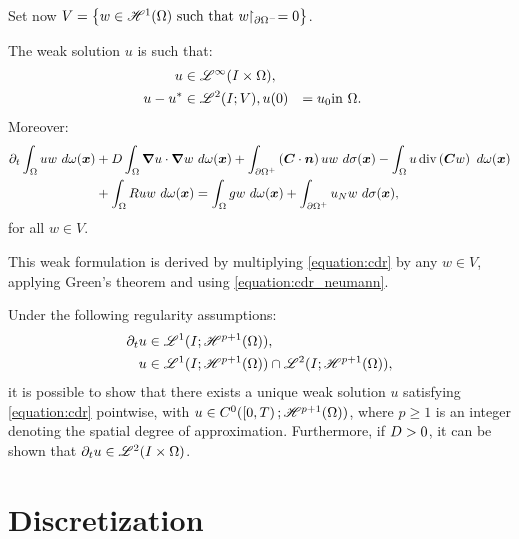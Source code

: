 Set now $V = \left\{ w \in \mathscr{H}^{1}(\Omega) \text{ such that } w \!\!\restriction_{\partial \Omega^-} = 0 \right\}$.

\begin{definition}
    The weak solution $u$ is such that: 
    \begin{align}
        u &\in \mathscr{L}^{\infty}(I \times \Omega), \\
        u - u^* &\in \mathscr{L}^{2}(I; V), 
        u(0) &= u_0 &\text{in } \Omega.
    \end{align}
    Moreover:
    \begin{align}
        \partial_t \int_{\Omega} u w ~ d \omega(\bm{x}) &+ D \int_{\Omega} \bm{\nabla} u \cdot \bm{\nabla} w ~ d \omega(\bm{x}) + \int_{\partial \Omega^+} \left( \bm{C} \cdot \bm{n} \right) u w ~ d \sigma(\bm{x}) - \int_{\Omega} u \operatorname*{div} \left( \bm{C} w \right) ~ d \omega(\bm{x}) \notag \\
        &+ \int_{\Omega} R u w ~ d \omega(\bm{x}) = \int_{\Omega} g w ~ d \omega(\bm{x}) + \int_{\partial \Omega^+} u_N w ~ d \sigma(\bm{x}),
    \end{align}
    for all $w \in V$.
\end{definition}
This weak formulation is derived by multiplying \cref{equation:cdr} by any $w \in V$, applying Green's theorem and using \cref{equation:cdr_neumann}. %

Under the following regularity assumptions:
\begin{align}
    \partial_t u & \in \mathscr{L}^{1}(I; \mathscr{H}^{p + 1}(\Omega)), \label{equation:assumption_regularity_1} \\
    u & \in \mathscr{L}^{1}(I; \mathscr{H}^{p + 1}(\Omega)) \cap \mathscr{L}^{2}(I; \mathscr{H}^{p + 1}(\Omega)), \label{equation:assumption_regularity_2}
\end{align}
it is possible to show that there exists a unique weak solution $u$ satisfying \cref{equation:cdr} pointwise, with $u \in C^0(\left[ 0, T \right); \mathscr{H}^{p + 1}(\Omega))$, where $p \geq 1$ is an integer denoting the spatial degree of approximation. Furthermore, if $D > 0$, it can be shown that $\partial_t u \in \mathscr{L}^{2}(I \times \Omega)$.

\newpage
\section{Discretization} \label{sec:cdr_discretization}

